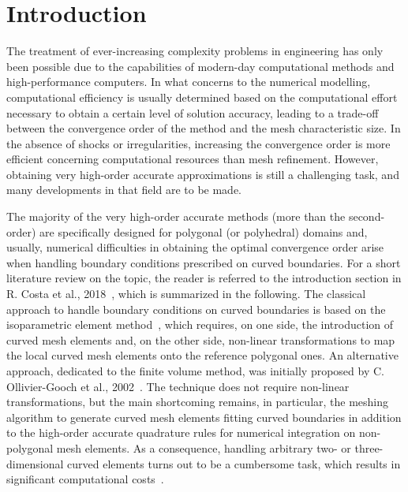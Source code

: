 \section{Introduction}
\label{chap2:sec:introduction}

The treatment of ever-increasing complexity problems in engineering has only been possible due to the capabilities of modern-day computational methods and high-performance computers.
In what concerns to the numerical modelling, computational efficiency is usually determined based on the computational effort necessary to obtain a certain level of solution accuracy, leading to a trade-off between the convergence order of the method and the mesh characteristic size.
In the absence of shocks or irregularities, increasing the convergence order is more efficient concerning computational resources than mesh refinement.
However, obtaining very high-order accurate approximations is still a challenging task, and many developments in that field are to be made.

The majority of the very high-order accurate methods (more than the second-order) are specifically designed for polygonal (or polyhedral) domains and, usually, numerical difficulties in obtaining the optimal convergence order arise when handling boundary conditions prescribed on curved boundaries.
For a short literature review on the topic, the reader is referred to the introduction section in R. Costa et al., 2018~\cite{chap2:2018costa1}, which is summarized in the following.
The classical approach to handle boundary conditions on curved boundaries is based on the isoparametric element method~\cite{chap2:2016lehrenfeld,chap2:2017lehrenfeld}, which requires, on one side, the introduction of curved mesh elements and, on the other side, non-linear transformations to map the local curved mesh elements onto the reference polygonal ones.
An alternative approach, dedicated to the finite volume method, was initially proposed by C. Ollivier-Gooch et al., 2002~\cite{chap2:2002ollivier}.
The technique does not require non-linear transformations, but the main shortcoming remains, in particular, the meshing algorithm to generate curved mesh elements fitting curved boundaries in addition to the high-order accurate quadrature rules for numerical integration on non-polygonal mesh elements.
As a consequence, handling arbitrary two- or three-dimensional curved elements turns out to be a cumbersome task, which results in significant computational costs~\cite{chap2:2009geuziane,chap2:2014wang,chap2:2015moxey}.

